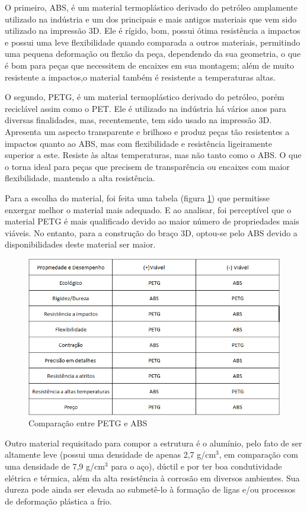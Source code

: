 O primeiro, ABS, é um material termoplástico derivado do petróleo amplamente utilizado na indústria e um dos principais e mais antigos materiais que vem sido utilizado na impressão 3D. Ele é rígido, bom, possui ótima resistência a impactos e possui uma leve flexibilidade quando comparada a outros materiais, permitindo uma pequena deformação ou flexão da peça, dependendo da sua geometria, o que é bom para peças que necessitem de encaixes em sua montagem; além de muito resistente a impactos,o material também é resistente a temperaturas altas. 

O segundo, PETG, é um material termoplástico derivado do petróleo, porém reciclável assim como o PET. Ele é utilizado na indústria há vários anos para diversas finalidades, mas, recentemente, tem sido usado na impressão 3D. Apresenta um aspecto transparente e brilhoso e produz peças tão resistentes a impactos quanto ao ABS, mas com flexibilidade e resistência ligeiramente superior a este. Resiste às altas temperaturas, mas não tanto como o ABS. O que o torna ideal para peças que precisem de transparência ou encaixes com maior flexibilidade, mantendo a alta resistência.
 
Para a escolha do material, foi feita uma tabela (figura \ref{des_fig12}) que permitisse enxergar melhor o material mais adequado. E ao analisar, foi perceptível que o material PETG é mais qualificado devido ao maior número de propriedades mais viáveis. No entanto, para a construção do braço 3D, optou-se pelo ABS devido a disponibilidades deste material ser maior.

\begin{figure}[H]
	\centering	\includegraphics[keepaspectratio=true,scale=0.8]{figuras/tabela_braco_mecanico_1.png}
	\caption{Comparação entre PETG e ABS}
	\label{des_fig12}
\end{figure}
Outro material requisitado para compor a estrutura é o alumínio, pelo fato de ser altamente leve (possui uma densidade de apenas 2,7 g/cm$^3$, em comparação com uma densidade de 7,9 g/cm$^3$ para o aço), dúctil e por ter boa condutividade elétrica e térmica, além da alta resistência à corrosão em diversos ambientes. Sua dureza pode ainda ser elevada ao submetê-lo à formação de ligas e/ou processos de deformação plástica a frio\cite{william2013}.

